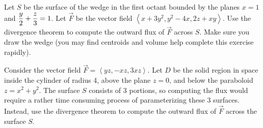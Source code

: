 




\begin{problem}
Let $S$ be the surface of the wedge in the first octant bounded by the planes $x=1$ and $\displaystyle\frac{y}{2}+\frac{z}{3}=1$. Let $\vec F$ be the vector field $\left<x+3y^2,y^2-4x,2z+xy\right>$. Use the divergence theorem to compute the outward flux of $\vec F$ across $S$. Make sure you draw the wedge (you may find centroids and volume help complete this exercise rapidly).  
\end{problem}

\begin{problem}
Consider the vector field $\vec F = \left<yz,-xz,3xz\right>$.  Let $D$ be the solid region in space inside the cylinder of radius 4, above the plane $z=0$, and below the paraboloid $z=x^2+y^2$.  The surface $S$ consists of 3 portions, so computing the flux would require a rather time consuming process of parameterizing these 3 surfaces.  Instead, use the divergence theorem to compute the outward flux of $\vec F$ across the surface $S$.
\end{problem}

